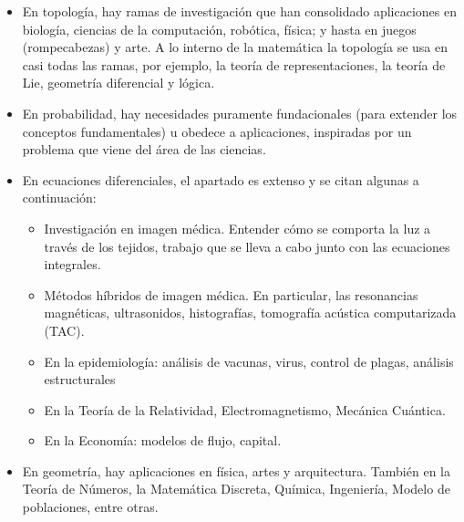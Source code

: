 \begin{itemize}
     \color{blue} \item \color{black} En topología, hay ramas de investigación que han consolidado aplicaciones en biología, ciencias de la computación, robótica, física; y hasta en juegos (rompecabezas) y arte. A lo interno de la matemática la topología se usa en casi todas las ramas, por ejemplo, la teoría de representaciones, la teoría de Lie, geometría diferencial y lógica. 
     
     \color{blue} \item \color{black} En probabilidad, hay necesidades puramente fundacionales (para extender los conceptos fundamentales) u obedece a aplicaciones, inspiradas por un problema que viene del área de las ciencias. 
     
     \color{blue} \item \color{black}  En ecuaciones diferenciales, el apartado es extenso y se citan algunas a continuación:
     
     \begin{itemize}
         
     
     \color{blue} \item \color{black} Investigación en imagen médica. Entender cómo se comporta la luz a través de los tejidos, trabajo que se lleva a cabo junto con las ecuaciones integrales. 
     
     \color{blue} \item \color{black} Métodos híbridos de imagen médica. En particular, las resonancias magnéticas, ultrasonidos, histografías, tomografía acústica computarizada (TAC).
     
     \color{blue} \item \color{black} En la epidemiología: análisis de vacunas, virus, control de plagas, análisis estructurales
     
     \color{blue} \item \color{black} En la Teoría de la Relatividad, Electromagnetismo, Mecánica Cuántica. 
     
     
      \color{blue} \item \color{black} En la Economía: modelos de flujo, capital.
      \end{itemize}
     
     \color{blue} \item \color{black} En geometría, hay aplicaciones en física, artes y arquitectura. También en la Teoría de Números, la Matemática Discreta, Química, Ingeniería, Modelo de poblaciones, entre otras.
     

\end{itemize}

